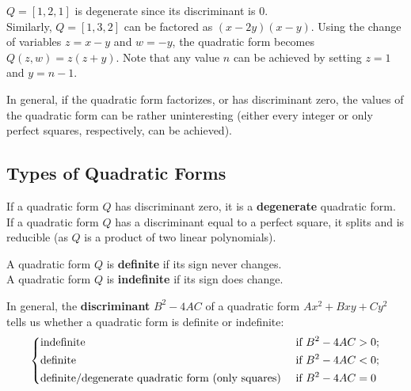 \documentclass[11pt]{article}
\begin{document}
\begin{remark}
$Q = [1, 2, 1]$ is degenerate since its discriminant is $0$. \\

Similarly, $Q = [1, 3, 2]$ can be factored as $(x-2y)(x-y)$. 
Using the change of variables $z = x-y$ and $w = -y$, the quadratic form becomes $Q(z, w) = z(z+y)$. 
Note that any value $n$ can be achieved by setting $z=1$ and $y = n-1$.

In general, if the quadratic form factorizes, or has discriminant zero, the values of the quadratic form can be rather uninteresting
(either every integer or only perfect squares, respectively, can be achieved).
\end{remark}

\subsection{Types of Quadratic Forms}
\begin{definition}
If a quadratic form $Q$ has discriminant zero, it is a \textbf{degenerate} quadratic form. \\

If a quadratic form $Q$ has a discriminant equal to a perfect square, it splits and is reducible 
(as $Q$ is a product of two linear polynomials).
\end{definition}

\begin{definition}
A quadratic form $Q$ is \textbf{definite} if its sign never changes. \\

A quadratic form $Q$ is \textbf{indefinite} if its sign does change. \\
\end{definition}

\begin{remark}
    In general, the \textbf{discriminant} $B^2 - 4AC$ of a quadratic form $Ax^2 + Bxy + Cy^2$ tells us whether a quadratic form is definite or indefinite:
    \[
        \begin{dcases}
            \text{indefinite } & \text{ if } B^2 - 4AC > 0 ;\\
            \text{definite} & \text{ if } B^2 - 4AC < 0  ;\\
            \text{definite/degenerate quadratic form (only squares)} & \text{ if } B^2 - 4AC = 0
        \end{dcases}
    \]
\end{remark}
\end{document}
